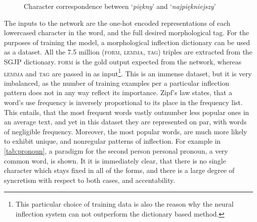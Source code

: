 \documentclass[12pt]{article}
\newcommand{\inlinegloss}[1]{`\textit{#1}'}
\begin{document}
\begin{figure}[H]
\centering
	\caption{Character correspondence between \inlinegloss{piękny} and \inlinegloss{najpiękniejszy}}
\end{figure}

The inputs to the network are the one-hot encoded representations of each lowercased character in the word, and the full desired morphological tag. For the purposes of training the model, a morphological inflection dictionary can be used as a dataset. All the 7.5 million \textsc{(form, lemma, tag)} triples are extracted from the SGJP dictionary. \textsc{form} is the gold output expected from the network, whereas \textsc{lemma} and \textsc{tag} are passed in as input\footnote{This particular choice of training data is also the reason why the neural inflection system can not outperform the dictionary based method.}. This is an immense dataset, but it is very imbalanced, as the number of training examples per a particular inflection pattern does not in any way reflect its importance. Zipf's law states, that a word's use frequency is inversely proportional to its place in the frequency list. This entails, that the most frequent words vastly outnumber less popular ones in an average text, and yet in this dataset they are represented on par, with words of negligible frequency. Moreover, the most popular words, are much more likely to exhibit unique, and nonregular patterns of inflection. For example in \autoref{tab:pronoun}, a paradigm for the second person personal pronoun, a very common word, is shown. It it is immediately clear, that there is no single character which stays fixed in all of the forms, and there is a large degree of syncretism with respect to both cases, and accentability. 
\end{document}
